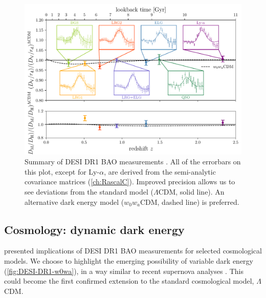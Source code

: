 \begin{figure}[htbp]
    \centering
    \includegraphics[width=\textwidth]{DR1/bao_isotropic_diagram_z_w0wa.pdf}
    \caption[Summary of DESI DR1 BAO measurements]{Summary of DESI DR1 BAO measurements \citep[figure by Arnaud de Mattia based on][]{DESI2024.III.KP4,DESI2024.IV.KP6,DESI2024.VI.KP7A}.
    All of the errorbars on this plot, except for Ly-$\alpha$, are derived from the \rascalc{} semi-analytic covariance matrices (\cref{ch:RascalC}).
    Improved precision allows us to see deviations from the standard model ($\Lambda$CDM, solid line).
    An alternative dark energy model ($w_0w_a$CDM, dashed line) is preferred.}
    \label{fig:DESI-DR1-BAO-diagram}
\end{figure}

\subsection{Cosmology: dynamic dark energy}

\cite{DESI2024.VI.KP7A} presented implications of DESI DR1 BAO measurements for selected cosmological models.
We choose to highlight the emerging possibility of variable dark energy (\cref{fig:DESI-DR1-w0wa}), in a way similar to recent supernova analyses \citep{PantheonPlus-cosmo,Union3,DES-Y5-SN-cosmo}.
This could become the first confirmed extension to the standard cosmological model, $\Lambda$CDM.

